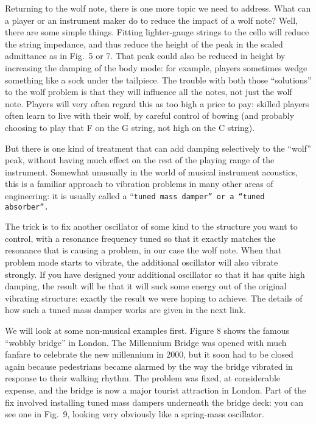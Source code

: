   Returning to the wolf note, there is one more topic we need to address. What 
  can a player or an instrument maker do to reduce the impact of a wolf note? 
  Well, there are some simple things. Fitting lighter-gauge strings to the 
  cello will reduce the string impedance, and thus reduce the height of the 
  peak in the scaled admittance as in Fig.\ 5 or 7. That peak could also be 
  reduced in height by increasing the damping of the body mode: for example, 
  players sometimes wedge something like a sock under the tailpiece. The 
  trouble with both those “solutions” to the wolf problem is that they will 
  influence all the notes, not just the wolf note. Players will very often 
  regard this as too high a price to pay: skilled players often learn to live 
  with their wolf, by careful control of bowing (and probably choosing to play 
  that F on the G string, not high on the C string). 

  But there is one kind of treatment that can add damping selectively to the 
  “wolf” peak, without having much effect on the rest of the playing range of 
  the instrument. Somewhat unusually in the world of musical instrument 
  acoustics, this is a familiar approach to vibration problems in many other 
  areas of engineering: it is usually called a “\tt{}tuned mass damper\rm{}” or 
  a “tuned absorber”. 

  The trick is to fix another oscillator of some kind to the structure you want 
  to control, with a resonance frequency tuned so that it exactly matches the 
  resonance that is causing a problem, in our case the wolf note. When that 
  problem mode starts to vibrate, the additional oscillator will also vibrate 
  strongly. If you have designed your additional oscillator so that it has 
  quite high damping, the result will be that it will suck some energy out of 
  the original vibrating structure: exactly the result we were hoping to 
  achieve. The details of how such a tuned mass damper works are given in the 
  next link. 

  We will look at some non-musical examples first. Figure 8 shows the famous 
  “wobbly bridge” in London. The Millennium Bridge was opened with much fanfare 
  to celebrate the new millennium in 2000, but it soon had to be closed again 
  because pedestrians became alarmed by the way the bridge vibrated in response 
  to their walking rhythm. The problem was fixed, at considerable expense, and 
  the bridge is now a major tourist attraction in London. Part of the fix 
  involved installing tuned mass dampers underneath the bridge deck: you can 
  see one in Fig.\ 9, looking very obviously like a spring-mass oscillator. 

